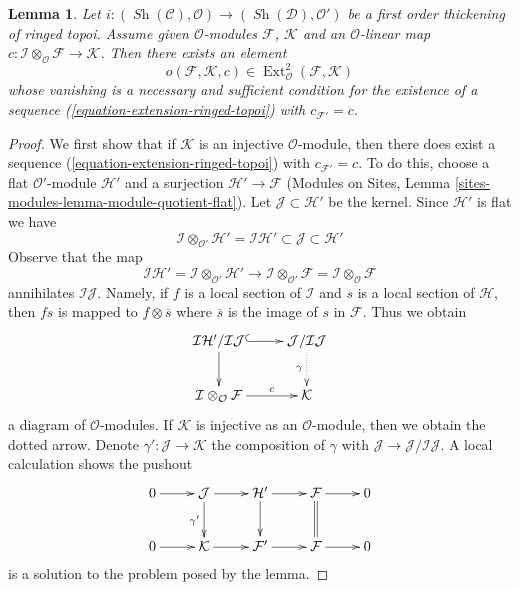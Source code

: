 \documentclass[10pt,a4paper]{amsart}
\theoremstyle{plain}
\newtheorem{lemma}[subsection]{Lemma}
\theoremstyle{definition}
\theoremstyle{remark}
\numberwithin{equation}{subsection}
\def\Ext{\mathop{\mathrm{Ext}}\nolimits}
\def\Sh{\mathop{\mathit{Sh}}\nolimits}
\begin{document}
\begin{lemma}
\label{lemma-inf-obs-ext-ringed-topoi}
Let $i : (\Sh(\mathcal{C}), \mathcal{O}) \to (\Sh(\mathcal{D}), \mathcal{O}')$
be a first order thickening of ringed topoi. Assume given
$\mathcal{O}$-modules $\mathcal{F}$, $\mathcal{K}$
and an $\mathcal{O}$-linear map
$c : \mathcal{I} \otimes_\mathcal{O} \mathcal{F} \to \mathcal{K}$.
Then there exists an element
$$
o(\mathcal{F}, \mathcal{K}, c) \in
\Ext^2_\mathcal{O}(\mathcal{F}, \mathcal{K})
$$
whose vanishing is a necessary and sufficient condition for the existence
of a sequence (\ref{equation-extension-ringed-topoi})
with $c_{\mathcal{F}'} = c$.
\end{lemma}

\begin{proof}
We first show that if $\mathcal{K}$ is an injective $\mathcal{O}$-module,
then there does exist a sequence (\ref{equation-extension-ringed-topoi}) with
$c_{\mathcal{F}'} = c$. To do this, choose a flat
$\mathcal{O}'$-module $\mathcal{H}'$ and a surjection
$\mathcal{H}' \to \mathcal{F}$
(Modules on Sites, Lemma \ref{sites-modules-lemma-module-quotient-flat}).
Let $\mathcal{J} \subset \mathcal{H}'$ be the kernel. Since $\mathcal{H}'$
is flat we have
$$
\mathcal{I} \otimes_{\mathcal{O}'} \mathcal{H}' =
\mathcal{I}\mathcal{H}'
\subset \mathcal{J} \subset \mathcal{H}'
$$
Observe that the map
$$
\mathcal{I}\mathcal{H}' =
\mathcal{I} \otimes_{\mathcal{O}'} \mathcal{H}'
\longrightarrow
\mathcal{I} \otimes_{\mathcal{O}'} \mathcal{F} =
\mathcal{I} \otimes_\mathcal{O} \mathcal{F}
$$
annihilates $\mathcal{I}\mathcal{J}$. Namely, if $f$ is a local section
of $\mathcal{I}$ and $s$ is a local section of $\mathcal{H}$, then
$fs$ is mapped to $f \otimes \overline{s}$ where $\overline{s}$ is
the image of $s$ in $\mathcal{F}$. Thus we obtain
$$
\xymatrix{
\mathcal{I}\mathcal{H}'/\mathcal{I}\mathcal{J}
\ar@{^{(}->}[r] \ar[d] &
\mathcal{J}/\mathcal{I}\mathcal{J} \ar@{..>}[d]_\gamma \\
\mathcal{I} \otimes_\mathcal{O} \mathcal{F} \ar[r]^-c &
\mathcal{K}
}
$$
a diagram of $\mathcal{O}$-modules. If $\mathcal{K}$ is injective
as an $\mathcal{O}$-module, then we obtain the dotted arrow.
Denote $\gamma' : \mathcal{J} \to \mathcal{K}$ the composition
of $\gamma$ with $\mathcal{J} \to \mathcal{J}/\mathcal{I}\mathcal{J}$.
A local calculation shows the pushout
$$
\xymatrix{
0 \ar[r] &
\mathcal{J} \ar[r] \ar[d]_{\gamma'} &
\mathcal{H}' \ar[r] \ar[d] &
\mathcal{F} \ar[r] \ar@{=}[d] &
0 \\
0 \ar[r] &
\mathcal{K} \ar[r] &
\mathcal{F}' \ar[r] &
\mathcal{F} \ar[r] &
0
}
$$
is a solution to the problem posed by the lemma.


\end{proof}
\end{document}
